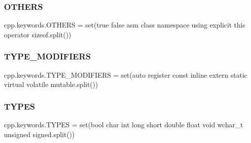 \mbox{\label{namespacecpp_1_1keywords_a15fe231fbad145538b73892804898809}} 
\subsubsection{\texorpdfstring{OTHERS}{OTHERS}}
{\footnotesize\ttfamily cpp.\+keywords.\+O\+T\+H\+E\+RS = set(\textquotesingle{}true false asm class namespace using explicit this operator sizeof\textquotesingle{}.split())}

\mbox{\label{namespacecpp_1_1keywords_af9282ce418d6b4b43dca5ed574caedd7}} 
\subsubsection{\texorpdfstring{TYPE\_MODIFIERS}{TYPE\_MODIFIERS}}
{\footnotesize\ttfamily cpp.\+keywords.\+T\+Y\+P\+E\+\_\+\+M\+O\+D\+I\+F\+I\+E\+RS = set(\textquotesingle{}auto register const inline extern static virtual volatile mutable\textquotesingle{}.split())}

\mbox{\label{namespacecpp_1_1keywords_a56fd5baf357970548e1ec366edfc2c13}} 
\subsubsection{\texorpdfstring{TYPES}{TYPES}}
{\footnotesize\ttfamily cpp.\+keywords.\+T\+Y\+P\+ES = set(\textquotesingle{}bool char int long short double float void wchar\+\_\+t unsigned signed\textquotesingle{}.split())}

